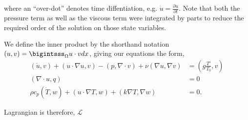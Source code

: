 \documentclass{article}
\begin{document}
where an ``over-dot'' denotes time diffentiation, e.g. $\dot u =
\frac{\partial u}{\partial t}$. Note that both the pressure term as well
as the viscous term were integrated by parts to reduce the required
order of the solution on those state variables.  

We define the inner product by the shorthand notation $(u,v) =
\bigintsss_\Omega u\cdot v dx $, giving our equations the form,  
\begin{align}
 (\dot u,v) + (u \cdot \nabla u, v) - (p,\nabla \cdot v) + \nu (\nabla
 u, \nabla v) &= (g \frac{T'}{T_0},v) \\
 (\nabla \cdot u, q) &= 0 \\
  \rho c_p (\dot T,w) + (u \cdot \nabla T,w) + (k \nabla T,\nabla w) &= 0.
\end{align}


Lagrangian is therefore,
$\mathcal{L}$
\end{document}
